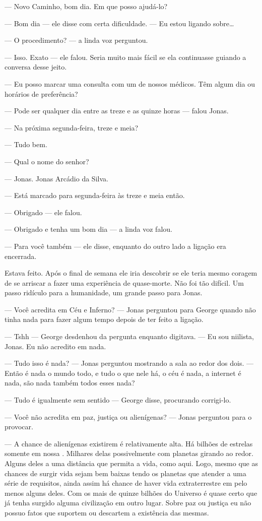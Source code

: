 --- Novo Caminho, bom dia. Em que posso ajudá-lo?

--- Bom dia --- ele disse com certa dificuldade. --- Eu estou ligando sobre\ldots

--- O procedimento? --- a linda voz perguntou.

--- Isso. Exato --- ele falou. Seria muito mais fácil se ela continuasse guiando a conversa desse jeito.

--- Eu posso marcar uma consulta com um de nossos médicos. Têm algum dia ou horários de preferência?

--- Pode ser qualquer dia entre as treze e as quinze horas --- falou Jonas.

--- Na próxima segunda-feira, treze e meia?

--- Tudo bem.

--- Qual o nome do senhor?

--- Jonas. Jonas Arcádio da Silva.

--- Está marcado para segunda-feira às treze e meia então.

--- Obrigado --- ele falou.

--- Obrigado e tenha um bom dia --- a linda voz falou.

--- Para você também --- ele disse, enquanto do outro lado a ligação era encerrada.

Estava feito. Após o final de semana ele iria descobrir se ele teria mesmo coragem de se arriscar a fazer uma experiência de quase-morte. Não foi tão difícil. Um passo ridículo para a humanidade, um grande passo para Jonas.

--- Você acredita em Céu e Inferno? --- Jonas perguntou para George quando não tinha nada para fazer algum tempo depois de ter feito a ligação.

--- Tshh ---  George desdenhou da pergunta enquanto digitava. --- Eu sou niilista, Jonas. Eu não acredito em nada.

--- Tudo isso é nada? --- Jonas perguntou mostrando a sala ao redor dos dois. --- Então é nada o mundo todo, e tudo o que nele há, o céu é nada, a internet é nada, são nada também todos esses nada?

--- Tudo é igualmente sem sentido --- George disse, procurando corrigi-lo.

--- Você não acredita em paz, justiça ou alienígenas? --- Jonas perguntou para o provocar.

--- A chance de alienígenas existirem é relativamente alta. Há bilhões de estrelas somente em nossa . Milhares delas possivelmente com planetas girando ao redor. Alguns deles a uma distância que permita a vida, como aqui. Logo, mesmo que as chances de surgir vida sejam bem baixas tendo os planetas que atender a uma série de requisitos, ainda assim há chance de haver vida extraterrestre em pelo menos alguns deles. Com os mais de quinze bilhões do Universo é quase certo que já tenha surgido alguma civilização em outro lugar. Sobre paz ou justiça eu não possuo fatos que suportem ou descartem a existência das mesmas.


